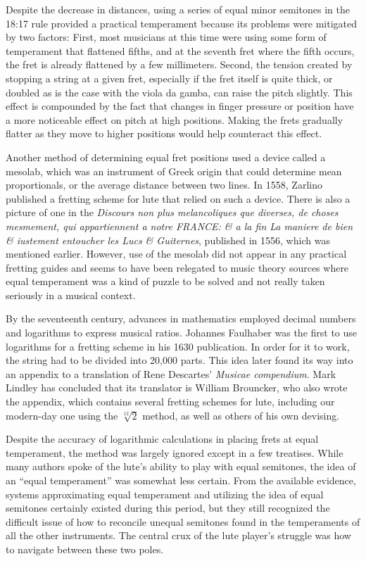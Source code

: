 Despite the decrease in distances, using a series of equal minor semitones in the 18:17
rule provided a practical temperament because its problems were mitigated by two
factors: First, most musicians at this time were using some form of temperament that
flattened fifths, and at the seventh fret where the fifth occurs, the fret is already
flattened by a few millimeters. Second, the tension created by stopping a string at a
given fret, especially if the fret itself is quite thick, or doubled as is the case
with the viola da gamba, can raise the pitch slightly. \autocite[21]{ML:1}  This effect
is compounded by the fact that changes in finger pressure or position have a more
noticeable effect on pitch at high positions. Making the frets gradually flatter as
they move to higher positions would help counteract this effect.

Another method of determining equal fret positions used a device called a mesolab,
which was an instrument of Greek origin that could determine mean proportionals, or the
average distance between two lines.  In 1558, Zarlino published a fretting scheme for
lute that relied on such a device. \autocite[26]{ML:1}  There is also a picture of one
in the \textit{Discours non plus melancoliques que diverses, de choses mesmement, qui
appartiennent a notre FRANCE: \& a la fin La maniere de bien \& iustement entoucher les
Lucs \& Guiternes}, published in 1556, which was mentioned earlier.  However, use of
the mesolab did not appear in any practical fretting guides and seems to have been relegated
to music theory sources where equal temperament was a kind of puzzle to be solved and
not really taken seriously in a musical context.

By the seventeenth century, advances in mathematics employed decimal numbers
and logarithms to express musical ratios.  Johannes Faulhaber was the first to use
logarithms for a fretting scheme in his 1630 publication. \autocite[21]{ML:1}  In order
for it to work, the string had to be divided into 20,000 parts.  This idea later found
its way into an appendix to a translation of Rene Descartes' \textit{Musicae
compendium}.  Mark Lindley has concluded that its translator is William Brouncker, who
also wrote the appendix, which contains several fretting schemes for lute,
including our modern-day one using the $ \sqrt[12]{2} $ method, as well as others
of his own devising.

Despite the accuracy of logarithmic calculations in placing frets at equal temperament,
the method was largely ignored except in a few treatises.  While many authors spoke of
the lute's ability to play with equal semitones, the idea of an ``equal temperament''
was somewhat less certain.  From the available evidence, systems approximating equal
temperament and utilizing the idea of equal semitones certainly existed during this
period, but they still recognized the difficult issue of how to reconcile
unequal semitones found in the temperaments of all the other instruments.  The
central crux of the lute player's struggle was how to navigate between these two poles.

